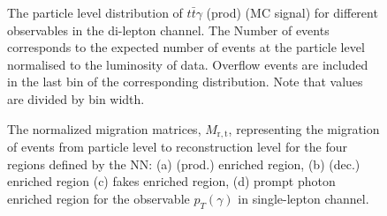 \begin{figure}[ht]
    \caption{The particle level distribution of $t\bar{t}\gamma$ (prod) (MC signal) for different observables in the di-lepton channel. The Number of events corresponds to the expected number of events at the particle level normalised to the luminosity of data. Overflow events are included in the last bin of the corresponding distribution.
    Note that values are divided by bin width.}
    \label{fig:folding_input_dilep1}
\end{figure}
\FloatBarrier


\begin{figure}[ht]
    \centering
    \quad\quad
    \quad\quad
    \quad\quad
    \quad\quad
    \caption{The normalized migration matrices, $M_{\mathrm{r,t}}$, representing the migration of events from particle level to reconstruction level  for the four regions defined by the NN: (a) \tty (prod.) enriched region, (b) \tty (dec.) enriched region
    (c) fakes enriched region, (d) prompt photon enriched region for the observable $p_T(\gamma)$ in single-lepton channel.}
    \label{fig:folding_input_migration_ljet}
\end{figure}
\FloatBarrier

